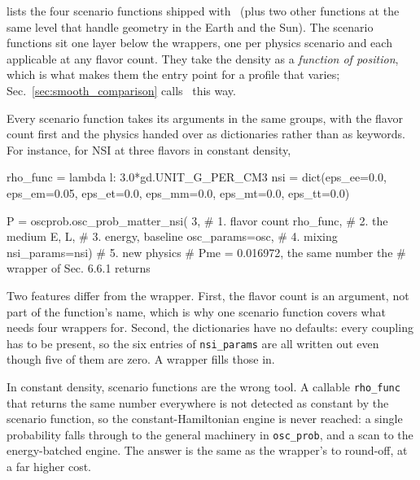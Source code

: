  lists the four scenario functions shipped with \magnus\ (plus two other functions at the same level that handle geometry in the Earth and the Sun). The scenario functions sit one layer below the wrappers, one per physics scenario and each applicable at any flavor count. They take the density as a \emph{function of position}, which is what makes them the entry point for a profile that varies; Sec.~\ref{sec:smooth_comparison} calls \magnus\ this way.

Every scenario function takes its arguments in the same groups, with the flavor count first and the physics handed over as dictionaries rather than as keywords. For instance, for NSI at three flavors in constant density,
\begin{pysnip}
rho_func = lambda l: 3.0*gd.UNIT_G_PER_CM3
nsi = dict(eps_ee=0.0, eps_em=0.05,
           eps_et=0.0, eps_mm=0.0,
           eps_mt=0.0, eps_tt=0.0)

P = oscprob.osc_prob_matter_nsi(
    3,               # 1. flavor count
    rho_func,        # 2. the medium
    E, L,            # 3. energy, baseline
    osc_params=osc,  # 4. mixing
    nsi_params=nsi)  # 5. new physics
# Pme = 0.016972, the same number the
# wrapper of Sec. 6.6.1 returns
\end{pysnip}
Two features differ from the wrapper. First, the flavor count is an argument, not part of the function's name, which is why one scenario function covers what  needs four wrappers for. Second, the dictionaries have no defaults: every coupling has to be present, so the six entries of {\tt nsi\_params} are all written out even though five of them are zero. A wrapper fills those in.

In constant density, scenario functions are the wrong tool. A callable {\tt rho\_func} that returns the same number everywhere is not detected as constant by the scenario function, so the constant-Hamiltonian engine is never reached: a single probability falls through to the general machinery in {\tt osc\_prob}, and a scan to the energy-batched engine. The answer is the same as the wrapper's to round-off, at a far higher cost.


